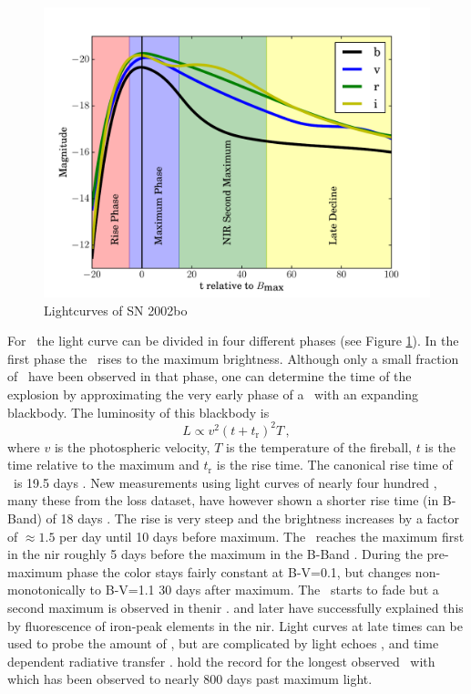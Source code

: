 \begin{figure}[htb] %
   \centering
   \includegraphics[width=\textwidth]{chapter_intro/plots/lightcurve_2002bo.pdf} 
   \caption{Lightcurves of SN 2002bo \citep[data from ][]{2004MNRAS.348..261B}}
   \label{fig:lightcurve_2002bo}
\end{figure}

For \sneia\ the light curve can be divided in four different phases (see Figure \ref{fig:lightcurve_2002bo}). In the first phase the \sneia\  rises to the maximum brightness. Although only a small fraction of \sneia\ have been observed in that phase, one can determine the time of the explosion by approximating the very early phase of a \sneia\ with an expanding blackbody. The luminosity of this blackbody is 
\[L\propto v^2 (t+t_\textrm{r})^2 T\,,\]
where $v$ is the photospheric velocity, $T$ is the temperature of the fireball, $t$ is the time relative to the maximum and $t_\textrm{r}$ is the rise time. The canonical rise time of \sneia\ is 19.5 days \citep{1999AJ....118.2675R}. New measurements using light curves of nearly four hundred \sneia, many these from the \gls{loss} dataset, have however shown a shorter rise time (in B-Band) of 18 days \citep{2011arXiv1107.2404G}. The rise is very steep and the brightness increases by a factor of $\approx 1.5$ per day until 10 days before maximum. The \snia\ reaches the maximum first in the \gls{nir} roughly 5 days before the maximum in the B-Band \citep{2000MNRAS.314..782M}. During the pre-maximum phase the color stays fairly constant at B-V=0.1, but changes non-monotonically to B-V=1.1 30 days after maximum. The \snia\ starts to fade but  a second maximum is observed in the\gls{nir} \citep{2008ApJ...689..377W}. \citet{2000ApJ...530..757P} and later \citet{2006ApJ...649..939K} have successfully explained this by fluorescence of iron-peak elements in the \gls{nir}. Light curves at late times can be used to probe the amount of , but are complicated by light echoes \cite[e.g.][]{1994ApJ...434L..19S}, and time dependent radiative transfer \citep{2005A&A...437..983K}. \citet{2009A&A...505..265L} hold the record for the longest observed \sneia\ with  which has been observed to nearly 800 days past maximum light.  

